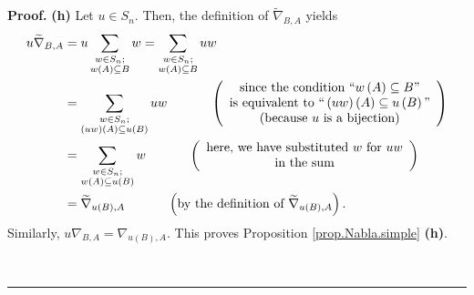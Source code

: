 \documentclass[numbers=enddot,12pt,final,onecolumn,notitlepage]{scrartcl}%
\numberwithin{exer}{subsection}
\theoremstyle{definition}
\newenvironment{proof}[1][Proof]{\noindent\textbf{#1.} }{\ \rule{0.5em}{0.5em}}
\let\sumnonlimits\sum
\renewcommand{\sum}{\sumnonlimits\limits}
\begin{document}
\begin{proof}
\textbf{(h)} Let $u\in S_{n}$. Then, the definition of $\widetilde{\nabla
}_{B,A}$ yields
\begin{align*}
u\widetilde{\nabla}_{B,A}  &  =u\sum_{\substack{w\in S_{n};\\w\left(
A\right)  \subseteq B}}w=\sum_{\substack{w\in S_{n};\\w\left(  A\right)
\subseteq B}}uw\\
&  =\sum_{\substack{w\in S_{n};\\\left(  uw\right)  \left(  A\right)
\subseteq u\left(  B\right)  }}uw\ \ \ \ \ \ \ \ \ \ \left(
\begin{array}
[c]{c}%
\text{since the condition \textquotedblleft}w\left(  A\right)  \subseteq
B\text{\textquotedblright}\\
\text{is equivalent to \textquotedblleft}\left(  uw\right)  \left(  A\right)
\subseteq u\left(  B\right)  \text{\textquotedblright}\\
\text{(because }u\text{ is a bijection)}%
\end{array}
\right) \\
&  =\sum_{\substack{w\in S_{n};\\w\left(  A\right)  \subseteq u\left(
B\right)  }}w\ \ \ \ \ \ \ \ \ \ \left(
\begin{array}
[c]{c}%
\text{here, we have substituted }w\text{ for }uw\\
\text{in the sum}%
\end{array}
\right) \\
&  =\widetilde{\nabla}_{u\left(  B\right)  ,A}\ \ \ \ \ \ \ \ \ \ \left(
\text{by the definition of }\widetilde{\nabla}_{u\left(  B\right)  ,A}\right)
.
\end{align*}
Similarly, $u\nabla_{B,A}=\nabla_{u\left(  B\right)  ,A}$. This proves
Proposition \ref{prop.Nabla.simple} \textbf{(h)}. \medskip


\end{proof}
\end{document}
